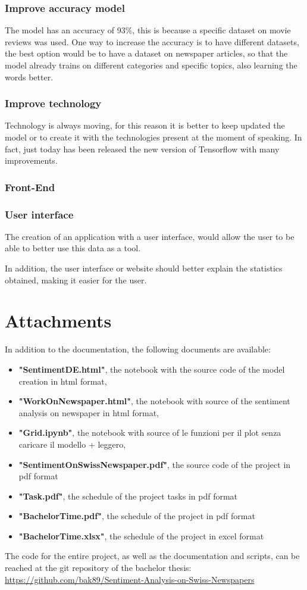 \subsubsection*{Improve accuracy model}
The model has an accuracy of 93\%, this is because a specific dataset on movie reviews was used.
One way to increase the accuracy is to have different datasets, the best option would be to have a dataset on newspaper articles, so that the model already trains on different categories and specific topics, also learning the words better.

\subsubsection*{Improve technology}
Technology is always moving, for this reason it is better to keep updated the model or to create it with the technologies present at the moment of speaking.
In fact, just today has been released the new version of Tensorflow with many improvements.


\subsubsection{Front-End}
\subsubsection*{User interface}
The creation of an application with a user interface, would allow the user to be able to better use this data as a tool.

In addition, the user interface or website should better explain the statistics obtained, making it easier for the user.



\newpage
\section{Attachments}
In addition to the documentation, the following documents are available:
\begin{itemize}
    \item \textbf{"SentimentDE.html"}, the notebook with the source code of the model creation in html format,
    \item \textbf{"WorkOnNewspaper.html"}, the notebook with source of the sentiment analysis on newspaper in html format,
    \item \textbf{"Grid.ipynb"}, the notebook with source of le funzioni per il plot senza caricare il modello + leggero,
    \item \textbf{"SentimentOnSwissNewspaper.pdf"}, the source code of the project in pdf format
    \item \textbf{"Task.pdf"}, the schedule of the project tasks in pdf format
    \item \textbf{"BachelorTime.pdf"}, the schedule of the project in pdf format
    \item \textbf{"BachelorTime.xlsx"}, the schedule of the project in excel format
\end{itemize}

The code for the entire project, as well as the documentation and scripts, can be reached at the git repository of the bachelor thesis: \url{https://github.com/bak89/Sentiment-Analysis-on-Swiss-Newspapers}

